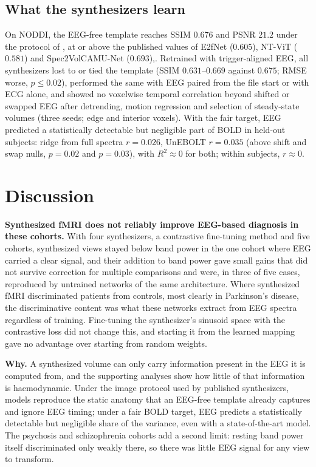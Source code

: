 \documentclass{article}
\begin{document}
\subsection{What the synthesizers learn}\label{section:res_fidelity}

On NODDI, the EEG-free template reaches SSIM $0.676$ and PSNR $21.2$ under the protocol of \cite{roos2025brainwaves}, at or above the published values of E2fNet ($0.605$), NT-ViT ($0.581$) and Spec2VolCAMU-Net ($0.693$),. Retrained with trigger-aligned EEG, all synthesizers lost to or tied the template (SSIM $0.631$--$0.669$ against $0.675$; RMSE worse, $p\leq0.02$), performed the same with EEG paired from the file start or with ECG alone, and showed no voxelwise temporal correlation beyond shifted or swapped EEG after detrending, motion regression and selection of steady-state volumes (three seeds; edge and interior voxels). With the fair target, EEG predicted a statistically detectable but negligible part of BOLD in held-out subjects: ridge from full spectra $r=0.026$, UnEBOLT $r=0.035$ (above shift and swap nulls, $p=0.02$ and $p=0.03$), with $R^2\approx0$ for both; within subjects, $r\approx0$.

\section{Discussion}\label{section:discussion}

\noindent\textbf{Synthesized fMRI does not reliably improve EEG-based diagnosis in these cohorts.} With four synthesizers, a contrastive fine-tuning method and five cohorts, synthesized views stayed below band power in the one cohort where EEG carried a clear signal, and their addition to band power gave small gains that did not survive correction for multiple comparisons and were, in three of five cases, reproduced by untrained networks of the same architecture. Where synthesized fMRI discriminated patients from controls, most clearly in Parkinson's disease, the discriminative content was what these networks extract from EEG spectra regardless of training. Fine-tuning the synthesizer's sinusoid space with the contrastive loss did not change this, and starting it from the learned mapping gave no advantage over starting from random weights.

\noindent\textbf{Why.} A synthesized volume can only carry information present in the EEG it is computed from, and the supporting analyses show how little of that information is haemodynamic. Under the image protocol used by published synthesizers, models reproduce the static anatomy that an EEG-free template already captures and ignore EEG timing; under a fair BOLD target, EEG predicts a statistically detectable but negligible share of the variance, even with a state-of-the-art model. The psychosis and schizophrenia cohorts add a second limit: resting band power itself discriminated only weakly there, so there was little EEG signal for any view to transform.
\end{document}
